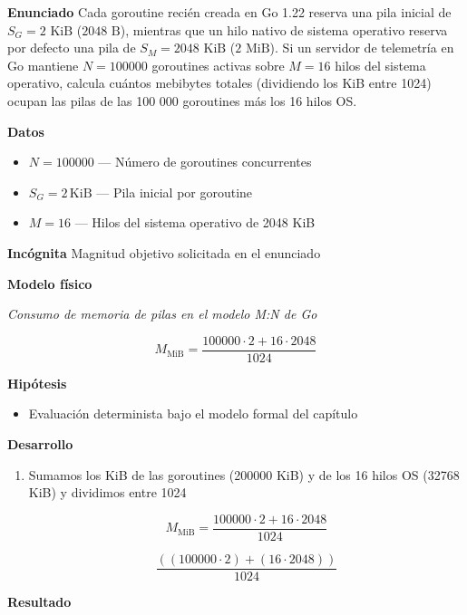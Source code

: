 \documentclass{book}
\begin{document}
\begin{tcolorbox}[title={Problema resuelto}, studiumworked, breakable]

\noindent\textbf{Enunciado}
Cada goroutine recién creada en Go 1.22 reserva una pila inicial de \(S_G = 2\text{ KiB}\) (\(2048\text{ B}\)), mientras que un hilo nativo de sistema operativo reserva por defecto una pila de \(S_M = 2048\text{ KiB}\) (\(2\text{ MiB}\)). Si un servidor de telemetría en Go mantiene \(N = 100000\) goroutines activas sobre \(M = 16\) hilos del sistema operativo, calcula cuántos mebibytes totales (dividiendo los KiB entre 1024) ocupan las pilas de las 100 000 goroutines más los 16 hilos OS.

\noindent\textbf{Datos}
\begin{itemize}
\item $N = 100000$ — Número de goroutines concurrentes
\item $S_{G} = 2\,\mathrm{KiB}$ — Pila inicial por goroutine
\item $M = 16$ — Hilos del sistema operativo de 2048 KiB
\end{itemize}

\noindent\textbf{Incógnita}
Magnitud objetivo solicitada en el enunciado

\noindent\textbf{Modelo físico}

\noindent\textit{Consumo de memoria de pilas en el modelo M:N de Go}

\[
M_{\text{MiB}} = \frac{100000 \cdot 2 + 16 \cdot 2048}{1024}
\]

\noindent\textbf{Hipótesis}
\begin{itemize}
\item Evaluación determinista bajo el modelo formal del capítulo
\end{itemize}

\noindent\textbf{Desarrollo}
\begin{enumerate}
\item
Sumamos los KiB de las goroutines (200000 KiB) y de los 16 hilos OS (32768 KiB) y dividimos entre 1024

\[
M_{\text{MiB}} = \frac{100000 \cdot 2 + 16 \cdot 2048}{1024}
\]

\[
\frac{\left(\left(100000\cdot 2\right)+\left(16\cdot 2048\right)\right)}{1024}
\]
\end{enumerate}

\noindent\textbf{Resultado}


\end{tcolorbox}
\end{document}
